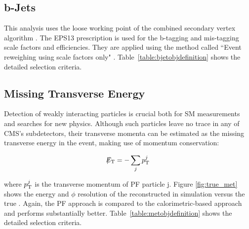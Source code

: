 \subsection{b-Jets} 
\label{subsec::objsel_bjet}

	

This analysis uses the loose working point of the combined secondary vertex algorithm \cite{CMS:2011cra}. The EPS13 prescription is used for the b-tagging and mis-tagging scale factors and efficiencies. They are applied using the method called ``Event reweighing using scale factors only" \cite{Ferencek:btag2015}. Table~\ref{table:bjetobjdefinition} shows the detailed selection criteria.

\subsection{Missing Transverse Energy}
\label{subsec::objsel_met}

Detection of weakly interacting particles is crucial both for SM measurements and searches for new physics. Although such particles leave no trace in any of CMS’s subdetectors, their transverse momenta can be estimated as the missing transverse energy in the event, making use of momentum conservation:

\begin{equation}
\slash\mkern-12mu{E}_{\text{T}} =  - \sum_{j} p_{\text{T}}^{j}
\end{equation}
 
where \ensuremath{\pt^{j}} is the transverse momentum of PF particle j. Figure \ref{fig:true_met} shows the energy and \ensuremath{\phi} resolution of the reconstructed \met in simulation versus the true \met. Again, the PF approach is compared to the calorimetric-based approach and performs substantially better. Table~\ref{table:metobjdefinition} shows the detailed selection criteria.

